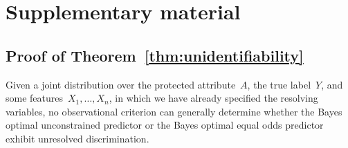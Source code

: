 \section*{Supplementary material}
\label{sec:appendix}

\subsection*{Proof of Theorem~\ref{thm:unidentifiability}}

\begin{theorem*}
  Given a joint distribution over the protected attribute~$A$, the true
  label~$Y$, and some features~$X_1, \dots, X_n$, in which we have already
  specified the resolving variables, no observational criterion can generally
  determine whether the Bayes optimal unconstrained predictor or the Bayes
  optimal equal odds predictor exhibit unresolved discrimination.
\end{theorem*}

